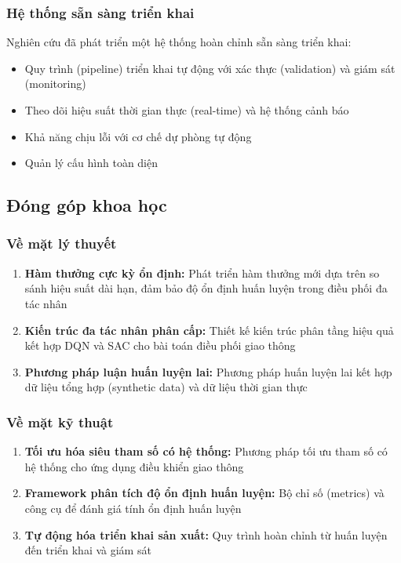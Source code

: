 \subsubsection{Hệ thống sẵn sàng triển khai}
Nghiên cứu đã phát triển một hệ thống hoàn chỉnh sẵn sàng triển khai:
\begin{itemize}
    \item Quy trình (pipeline) triển khai tự động với xác thực (validation) và giám sát (monitoring)

    \item Theo dõi hiệu suất thời gian thực (real-time) và hệ thống cảnh báo

    \item Khả năng chịu lỗi với cơ chế dự phòng tự động

    \item Quản lý cấu hình toàn diện
\end{itemize}

\subsection{Đóng góp khoa học}

\subsubsection{Về mặt lý thuyết}
\begin{enumerate}
    \item \textbf{Hàm thưởng cực kỳ ổn định:} Phát triển hàm thưởng mới dựa
        trên so sánh hiệu suất dài hạn, đảm bảo độ ổn định huấn luyện trong điều phối đa tác nhân

    \item \textbf{Kiến trúc đa tác nhân phân cấp:} Thiết kế kiến trúc
        phân tầng hiệu quả kết hợp DQN và SAC cho bài toán điều phối giao thông

    \item \textbf{Phương pháp luận huấn luyện lai:} Phương pháp huấn luyện lai
        kết hợp dữ liệu tổng hợp (synthetic data) và dữ liệu thời gian thực
\end{enumerate}

\subsubsection{Về mặt kỹ thuật}
\begin{enumerate}
    \item \textbf{Tối ưu hóa siêu tham số có hệ thống:} Phương pháp tối ưu
        tham số có hệ thống cho ứng dụng điều khiển giao thông

    \item \textbf{Framework phân tích độ ổn định huấn luyện:} Bộ chỉ số (metrics) và công cụ để
        đánh giá tính ổn định huấn luyện

    \item \textbf{Tự động hóa triển khai sản xuất:} Quy trình hoàn chỉnh từ
        huấn luyện đến triển khai và giám sát
\end{enumerate}

